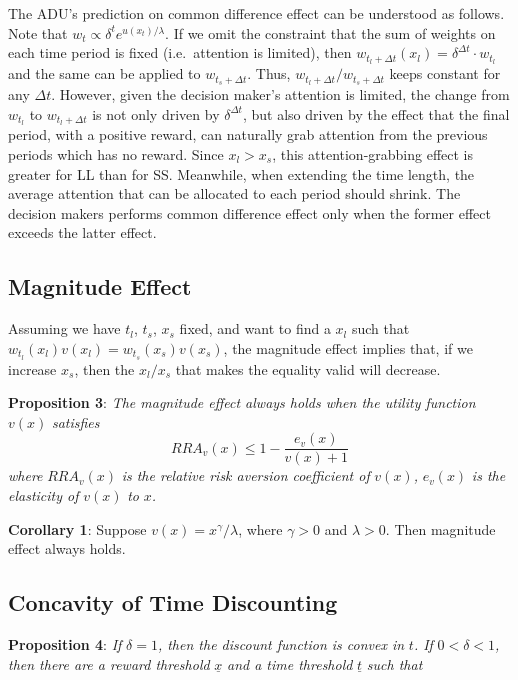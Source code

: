 \documentclass[
  12pt,
]{article}
\begin{document}
The ADU's prediction on common difference effect can be understood as
follows. Note that \(w_t \propto \delta^t e^{u(x_t)/\lambda}\). If we
omit the constraint that the sum of weights on each time period is fixed
(i.e.~attention is limited), then
\(w_{t_l+\Delta t}(x_l) = \delta^{\Delta t} \cdot w_{t_l}\) and the same
can be applied to \(w_{t_s+\Delta t}\). Thus,
\(w_{t_l+\Delta t} / w_{t_s+\Delta t}\) keeps constant for any
\(\Delta t\). However, given the decision maker's attention is limited,
the change from \(w_{t_l}\) to \(w_{t_l+\Delta t}\) is not only driven
by \(\delta^{\Delta t}\), but also driven by the effect that the final
period, with a positive reward, can naturally grab attention from the
previous periods which has no reward. Since \(x_l > x_s\), this
attention-grabbing effect is greater for LL than for SS. Meanwhile, when
extending the time length, the average attention that can be allocated
to each period should shrink. The decision makers performs common
difference effect only when the former effect exceeds the latter effect.

\hypertarget{magnitude-effect}{%
\subsection{Magnitude Effect}\label{magnitude-effect}}

Assuming we have \(t_l\), \(t_s\), \(x_s\) fixed, and want to find a
\(x_l\) such that \(w_{t_l}(x_l)v(x_l) = w_{t_s}(x_s)v(x_s)\), the
magnitude effect implies that, if we increase \(x_s\), then the
\(x_l/x_s\) that makes the equality valid will decrease.

\textbf{Proposition 3}: \emph{The magnitude effect always holds when the
utility function} \(v(x)\) \emph{satisfies}\[
RRA_v(x)\leq 1-\frac{e_v(x)}{v(x)+1}
\]\emph{where} \(RRA_v(x)\) \emph{is the relative risk aversion
coefficient of} \(v(x)\)\emph{,} \(e_v(x)\) \emph{is the elasticity of}
\(v(x)\) \emph{to} \(x\)\emph{.}

\textbf{Corollary 1}: Suppose \(v(x)=x^\gamma/\lambda\), where
\(\gamma>0\) and \(\lambda>0\). Then magnitude effect always holds.

\hypertarget{concavity-of-time-discounting}{%
\subsection{Concavity of Time
Discounting}\label{concavity-of-time-discounting}}

\textbf{Proposition 4}: \emph{If} \(\delta =1\)\emph{, then the discount
function is convex in} \(t\)\emph{. If} \(0<\delta<1\)\emph{, then there
are a reward threshold} \(\underline{x}\) \emph{and a time threshold}
\(\underline{t}\) \emph{such that}
\end{document}
